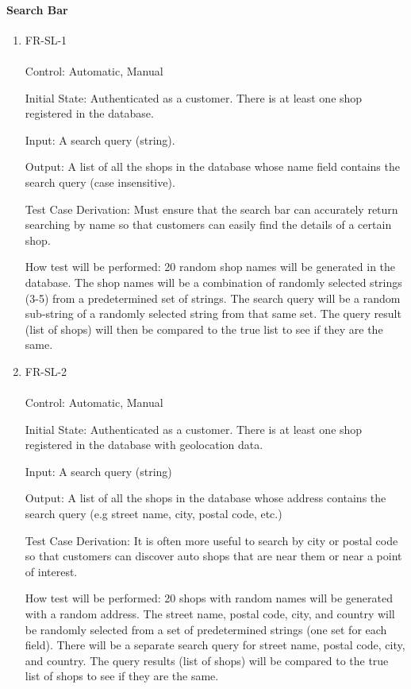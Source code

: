 \documentclass[12pt, titlepage]{article}
\begin{document}
    \paragraph{Search Bar}
        \begin{enumerate}
            \item{FR-SL-1} \\ \\
                Control: Automatic, Manual \par
                Initial State: Authenticated as a customer. There is at least one shop registered in the database.\par
                Input: A search query (string).\par
                Output: A list of all the shops in the database whose name field contains the search query (case insensitive).\par
                Test Case Derivation: Must ensure that the search bar can accurately return searching by name so that customers can easily find the details of a certain shop.\par
                How test will be performed: 20 random shop names will be generated in the database. The shop names will be a combination of randomly selected strings (3-5) from a predetermined set of strings. The search query will be a random sub-string of a randomly selected string from that same set. The query result (list of shops) will then be compared to the true list to see if they are the same.\par
            \item{FR-SL-2} \\ \\
                Control: Automatic, Manual \par
                Initial State: Authenticated as a customer. There is at least one shop registered in the database with geolocation data.\par
                Input: A search query (string)\par
                Output: A list of all the shops in the database whose address contains the search query (e.g street name, city, postal code, etc.)\par
                Test Case Derivation: It is often more useful to search by city or postal code so that customers can discover auto shops that are near them or near a point of interest.\par
                How test will be performed: 20 shops with random names will be generated with a random address. The street name, postal code, city, and country will be randomly selected from a set of predetermined strings (one set for each field). There will be a separate search query for street name, postal code, city, and country. The query results (list of shops) will be compared to the true list of shops to see if they are the same. \par
        \end{enumerate}
        
\end{document}
